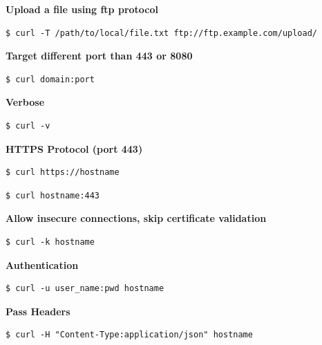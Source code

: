 \documentclass{article}
\newenvironment{codetemplate}[1][]{%
  \mybasecolorbox[#1]
  \itshape
}{%
  \endmybasecolorbox
}
\begin{document}
\textbf{Upload a file using ftp protocol}
\begin{codetemplate}{}
\begin{verbatim}
$ curl -T /path/to/local/file.txt ftp://ftp.example.com/upload/
\end{verbatim}
\end{codetemplate}

\textbf{Target different port than 443 or 8080}
\begin{codetemplate}{}
\begin{verbatim}
$ curl domain:port
\end{verbatim}
\end{codetemplate}

\textbf{Verbose}
\begin{codetemplate}{}
\begin{verbatim}
$ curl -v 
\end{verbatim}
\end{codetemplate}

\textbf{HTTPS Protocol (port 443)}
\begin{codetemplate}{}
\begin{verbatim}
$ curl https://hostname
\end{verbatim}
\end{codetemplate}
\begin{codetemplate}{}
\begin{verbatim}
$ curl hostname:443
\end{verbatim}
\end{codetemplate}

\textbf{Allow insecure connections, skip certificate validation}
\begin{codetemplate}{}
\begin{verbatim}
$ curl -k hostname
\end{verbatim}
\end{codetemplate}

\textbf{Authentication}
\begin{codetemplate}{}
\begin{verbatim}
$ curl -u user_name:pwd hostname 
\end{verbatim}
\end{codetemplate}

\textbf{Pass Headers}
\begin{codetemplate}{}
\begin{verbatim}
$ curl -H "Content-Type:application/json" hostname 
\end{verbatim}
\end{codetemplate}
\end{document}
